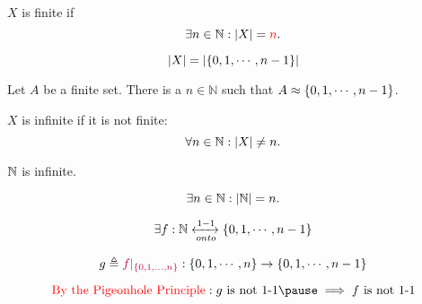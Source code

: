 \begin{frame}{}
  \begin{definition}[Finite]
    $X$ is finite if
    \[
      \exists n \in \mathbb{N}: |X| = \textcolor{red}{n}.
    \]
  \end{definition}

  \pause
  \[
    |X| = |\{0, 1, \cdots, n-1\}|
  \]

  \pause
  \begin{theorem}[]
    Let $A$ be a finite set.
    There is a  $n \in \mathbb{N}$ such that $A \approx \{0, 1, \cdots, n-1\}$.
  \end{theorem}

\end{frame}

\begin{frame}{}
  \begin{definition}[Infinite]
    $X$ is infinite if it is not finite:
    \[
      \forall n \in \mathbb{N}: |X| \neq n.
    \]
  \end{definition}

  \pause
  \begin{theorem}[]
    $\mathbb{N}$ is infinite. 
  \end{theorem}

  \pause
  \begin{center}

    \pause
    \vspace{-0.30cm}
    \[
      \exists n \in \mathbb{N}: |\mathbb{N}| = n.
    \]

    \pause
    \vspace{-0.30cm}
    \[
      \exists f: \mathbb{N} \xleftrightarrow[onto]{1-1} \{0, 1, \cdots, n-1\}
    \]

    \pause
    \vspace{-0.30cm}
    \[
      g \triangleq \textcolor{purple}{f|_{\{0, 1, \ldots, n\}}}: \{0, 1, \cdots, n\} \to \{0, 1, \cdots, n-1\}
    \]

    \pause
    \vspace{-0.30cm}
    \[
      \text{\red{By the Pigeonhole Principle}}: g \text{ is not 1-1} \pause \implies f \text{ is not 1-1}
    \]
  \end{center}
\end{frame}

